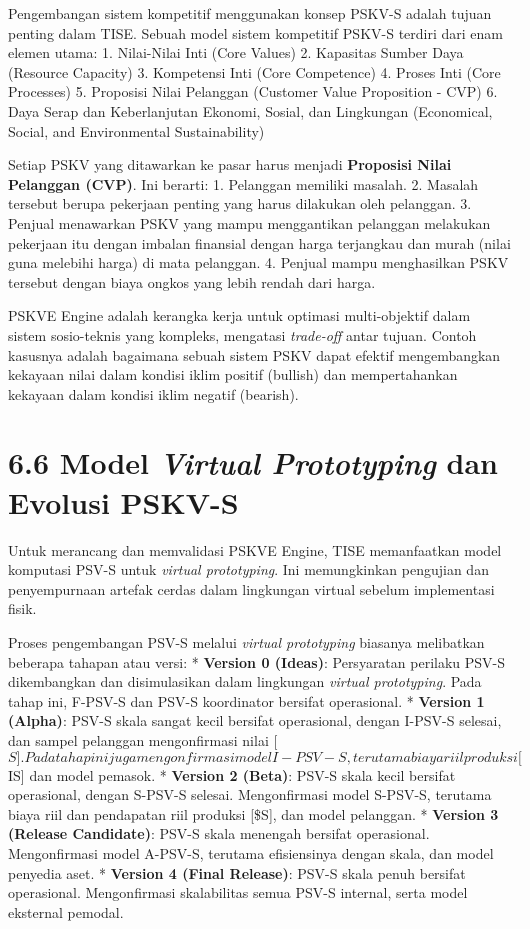 \documentclass[
  letterpaper,
  DIV=11,
  numbers=noendperiod]{scrreprt}
\begin{document}
Pengembangan sistem kompetitif menggunakan konsep PSKV-S adalah tujuan
penting dalam TISE. Sebuah model sistem kompetitif PSKV-S terdiri dari
enam elemen utama: 1. Nilai-Nilai Inti (Core Values) 2. Kapasitas Sumber
Daya (Resource Capacity) 3. Kompetensi Inti (Core Competence) 4. Proses
Inti (Core Processes) 5. Proposisi Nilai Pelanggan (Customer Value
Proposition - CVP) 6. Daya Serap dan Keberlanjutan Ekonomi, Sosial, dan
Lingkungan (Economical, Social, and Environmental Sustainability)

Setiap PSKV yang ditawarkan ke pasar harus menjadi \textbf{Proposisi
Nilai Pelanggan (CVP)}. Ini berarti: 1. Pelanggan memiliki masalah. 2.
Masalah tersebut berupa pekerjaan penting yang harus dilakukan oleh
pelanggan. 3. Penjual menawarkan PSKV yang mampu menggantikan pelanggan
melakukan pekerjaan itu dengan imbalan finansial dengan harga terjangkau
dan murah (nilai guna melebihi harga) di mata pelanggan. 4. Penjual
mampu menghasilkan PSKV tersebut dengan biaya ongkos yang lebih rendah
dari harga.

PSKVE Engine adalah kerangka kerja untuk optimasi multi-objektif dalam
sistem sosio-teknis yang kompleks, mengatasi \emph{trade-off} antar
tujuan. Contoh kasusnya adalah bagaimana sebuah sistem PSKV dapat
efektif mengembangkan kekayaan nilai dalam kondisi iklim positif
(bullish) dan mempertahankan kekayaan dalam kondisi iklim negatif
(bearish).

\section{\texorpdfstring{\textbf{6.6 Model \emph{Virtual Prototyping}
dan Evolusi
PSKV-S}}{6.6 Model Virtual Prototyping dan Evolusi PSKV-S}}\label{model-virtual-prototyping-dan-evolusi-pskv-s}

Untuk merancang dan memvalidasi PSKVE Engine, TISE memanfaatkan model
komputasi PSV-S untuk \emph{virtual prototyping}. Ini memungkinkan
pengujian dan penyempurnaan artefak cerdas dalam lingkungan virtual
sebelum implementasi fisik.

Proses pengembangan PSV-S melalui \emph{virtual prototyping} biasanya
melibatkan beberapa tahapan atau versi: * \textbf{Version 0 (Ideas)}:
Persyaratan perilaku PSV-S dikembangkan dan disimulasikan dalam
lingkungan \emph{virtual prototyping}. Pada tahap ini, F-PSV-S dan PSV-S
koordinator bersifat operasional. * \textbf{Version 1 (Alpha)}: PSV-S
skala sangat kecil bersifat operasional, dengan I-PSV-S selesai, dan
sampel pelanggan mengonfirmasi nilai
{[}\(S]. Pada tahap ini juga mengonfirmasi model I-PSV-S, terutama biaya riil produksi [\)IS{]}
dan model pemasok. * \textbf{Version 2 (Beta)}: PSV-S skala kecil
bersifat operasional, dengan S-PSV-S selesai. Mengonfirmasi model
S-PSV-S, terutama biaya riil dan pendapatan riil produksi {[}\$S{]}, dan
model pelanggan. * \textbf{Version 3 (Release Candidate)}: PSV-S skala
menengah bersifat operasional. Mengonfirmasi model A-PSV-S, terutama
efisiensinya dengan skala, dan model penyedia aset. * \textbf{Version 4
(Final Release)}: PSV-S skala penuh bersifat operasional. Mengonfirmasi
skalabilitas semua PSV-S internal, serta model eksternal pemodal.
\end{document}
